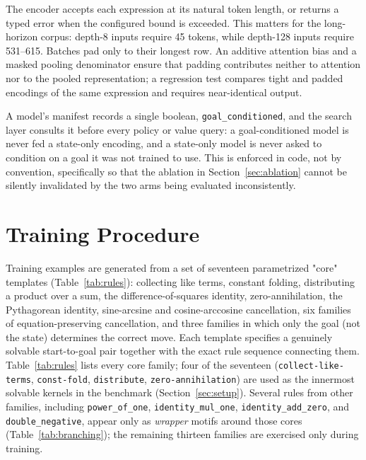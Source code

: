 \documentclass[11pt]{article}
\numberwithin{equation}{section}
\begin{document}
The encoder accepts each expression at its natural token length, or returns a typed error when the configured bound is exceeded. This matters for the long-horizon corpus: depth-8 inputs require 45 tokens, while depth-128 inputs require 531--615. Batches pad only to their longest row. An additive attention bias and a masked pooling denominator ensure that padding contributes neither to attention nor to the pooled representation; a regression test compares tight and padded encodings of the same expression and requires near-identical output.

A model's manifest records a single boolean, \texttt{goal\_conditioned}, and the search layer consults it before every policy or value query: a goal-conditioned model is never fed a state-only encoding, and a state-only model is never asked to condition on a goal it was not trained to use. This is enforced in code, not by convention, specifically so that the ablation in Section~\ref{sec:ablation} cannot be silently invalidated by the two arms being evaluated inconsistently.

\section{Training Procedure}
\label{sec:training}

Training examples are generated from a set of seventeen parametrized "core" templates (Table~\ref{tab:rules}): collecting like terms, constant folding, distributing a product over a sum, the difference-of-squares identity, zero-annihilation, the Pythagorean identity, sine-arcsine and cosine-arccosine cancellation, six families of equation-preserving cancellation, and three families in which only the goal (not the state) determines the correct move. Each template specifies a genuinely solvable start-to-goal pair together with the exact rule sequence connecting them. Table~\ref{tab:rules} lists every core family; four of the seventeen (\texttt{collect-like-terms}, \texttt{const-fold}, \texttt{distribute}, \texttt{zero-annihilation}) are used as the innermost solvable kernels in the benchmark (Section~\ref{sec:setup}). Several rules from other families, including \texttt{power\_of\_one}, \texttt{identity\_mul\_one}, \texttt{identity\_add\_zero}, and \texttt{double\_negative}, appear only as \emph{wrapper} motifs around those cores (Table~\ref{tab:branching}); the remaining thirteen families are exercised only during training.
\end{document}
